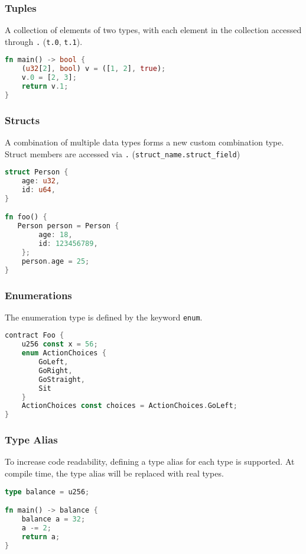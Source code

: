 \subsubsection*{Tuples}

A collection of elements of two types, with each element in the collection accessed through \texttt{.} (\texttt{t.0}, \texttt{t.1}).

\begin{lstlisting}[language=rust]
fn main() -> bool {
    (u32[2], bool) v = ([1, 2], true);
    v.0 = [2, 3];
    return v.1;
}
\end{lstlisting}

\subsubsection*{Structs}

A combination of multiple data types forms a new custom combination type. Struct members are accessed via \texttt{.} (\texttt{struct\_name.struct\_field})

\begin{lstlisting}[language=rust]
struct Person {
    age: u32,
    id: u64,
}

fn foo() {
   Person person = Person {
        age: 18,
        id: 123456789,
    };
    person.age = 25;
}
\end{lstlisting}

\subsubsection*{Enumerations}

The enumeration type is defined by the keyword \texttt{enum}.

\begin{lstlisting}[language=rust]
contract Foo {
    u256 const x = 56;
    enum ActionChoices {
        GoLeft,
        GoRight,
        GoStraight,
        Sit
    }
    ActionChoices const choices = ActionChoices.GoLeft;
}
\end{lstlisting}


\subsubsection*{Type Alias}

To increase code readability, defining a type alias for each type is supported. At compile time, the type alias will be replaced with real types.

\begin{lstlisting}[language=rust]
type balance = u256;

fn main() -> balance {
    balance a = 32;
    a -= 2;
    return a;
}
\end{lstlisting}

